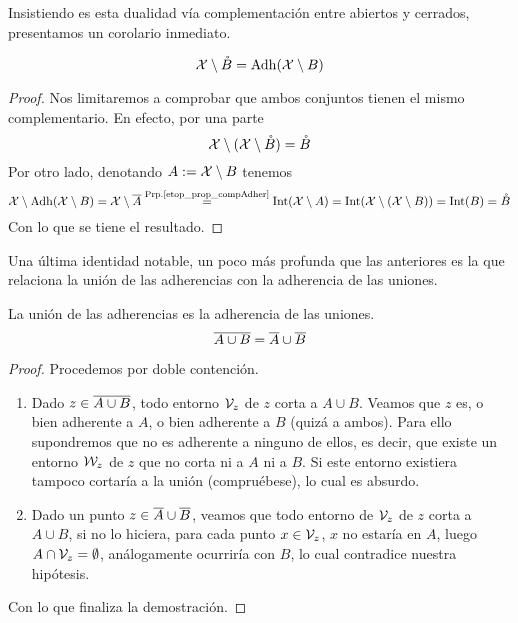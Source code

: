 Insistiendo es esta dualidad vía complementación entre abiertos y cerrados, presentamos un corolario inmediato.
\begin{cor}
	\label{etop_cor_compInter}
	\begin{equation*}
		\mathcal{X}\setminus\mathring{B}=\operatorname{\mathrm{Adh}}(\mathcal{X} \setminus B)
	\end{equation*}
\end{cor}
\begin{proof}
	Nos limitaremos a comprobar que ambos conjuntos tienen el mismo complementario. En efecto, por una parte
	\begin{equation*}
		\mathcal{X} \setminus (\mathcal{X} \setminus \mathring{B}) = \mathring{B}
	\end{equation*}
	Por otro lado, denotando $A:=\mathcal{X} \setminus B$ tenemos
	\begin{equation*}
		\mathcal{X} \setminus \operatorname{\mathrm{Adh}}(\mathcal{X} \setminus B)=\mathcal{X} \setminus \overline{A}\stackrel{\textrm{Prp.\ref{etop_prop_compAdher}}}{=}\operatorname{\mathrm{Int}}(\mathcal{X} \setminus A)=\operatorname{\mathrm{Int}}(\mathcal{X} \setminus (\mathcal{X} \setminus B))=\operatorname{\mathrm{Int}}(B)=\mathring{B}
	\end{equation*}
	Con lo que se tiene el resultado.
\end{proof}
Una última identidad notable, un poco más profunda que las anteriores es la que relaciona la unión de las adherencias con la adherencia de las uniones.
\begin{prop}
	La unión de las adherencias es la adherencia de las uniones.
	\label{etop_prop_unionAdher}
	\begin{equation*}
		\overline{A\cup B}=\overline{A}\cup\overline{B}
	\end{equation*}
\end{prop}
\begin{proof}
	Procedemos por doble contención.
	\begin{enumerate}
		\item[\bsubset] 
		Dado $z\in \overline{A\cup B}$, todo entorno $\mathcal{V}_z$ de $z$ corta a $A\cup B$. Veamos que $z$ es, o bien adherente a $A$, o bien adherente a $B$ (quizá a ambos). Para ello supondremos que no es adherente a ninguno de ellos, es decir, que existe un entorno $\mathcal{W}_z$ de $z$ que no corta ni a $A$ ni a $B$. Si este entorno existiera tampoco cortaría a la unión (compruébese), lo cual es absurdo.
		\item[\bsupset]
		Dado un punto $z\in\overline{A}\cup\overline{B}$, veamos que todo entorno de $\mathcal{V}_z$ de $z$ corta a $A\cup B$, si no lo hiciera, para cada punto $x\in\mathcal{V}_z$, $x$ no estaría en $A$, luego $A\cap \mathcal{V}_z=\emptyset$, análogamente ocurriría con $B$, lo cual contradice nuestra hipótesis.
	\end{enumerate}
	Con lo que finaliza la demostración.
\end{proof}
